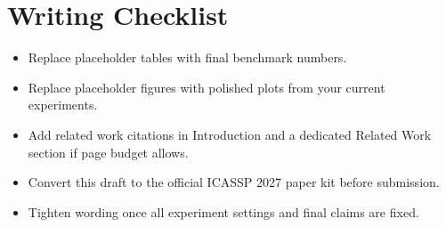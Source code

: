 \documentclass[10pt,a4paper]{article}
\begin{document}
\section*{Writing Checklist}
\begin{itemize}
    \item Replace placeholder tables with final benchmark numbers.
    \item Replace placeholder figures with polished plots from your current experiments.
    \item Add related work citations in Introduction and a dedicated Related Work section if page budget allows.
    \item Convert this draft to the official ICASSP 2027 paper kit before submission.
    \item Tighten wording once all experiment settings and final claims are fixed.
\end{itemize}
\end{document}

